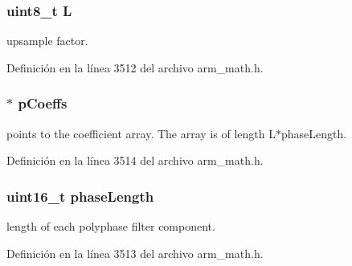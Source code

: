 \subsubsection[{\texorpdfstring{L}{L}}]{\setlength{\rightskip}{0pt plus 5cm}uint8\+\_\+t L}\hypertarget{structarm__fir__interpolate__instance__q31_aee73cc056696e504430c53eaa9c58cf0}{}\label{structarm__fir__interpolate__instance__q31_aee73cc056696e504430c53eaa9c58cf0}
upsample factor. 

Definición en la línea 3512 del archivo arm\+\_\+math.\+h.

\subsubsection[{\texorpdfstring{p\+Coeffs}{pCoeffs}}]{$\ast$ p\+Coeffs}\hypertarget{structarm__fir__interpolate__instance__q31_a68888e36167d81cb7836db10367a1682}{}\label{structarm__fir__interpolate__instance__q31_a68888e36167d81cb7836db10367a1682}
points to the coefficient array. The array is of length L$\ast$phase\+Length. 

Definición en la línea 3514 del archivo arm\+\_\+math.\+h.

\subsubsection[{\texorpdfstring{phase\+Length}{phaseLength}}]{\setlength{\rightskip}{0pt plus 5cm}uint16\+\_\+t phase\+Length}\hypertarget{structarm__fir__interpolate__instance__q31_a8f92bb07e0812f94679438cdf412b26a}{}\label{structarm__fir__interpolate__instance__q31_a8f92bb07e0812f94679438cdf412b26a}
length of each polyphase filter component. 

Definición en la línea 3513 del archivo arm\+\_\+math.\+h.

